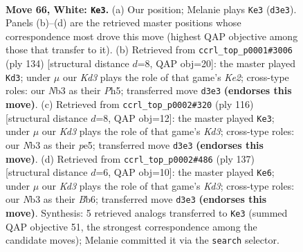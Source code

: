 \documentclass[11pt]{article}
\begin{document}
\clearpage

\begin{figure}[p]\centering
\begin{subfigure}{0.46\textwidth}\centering
\resizebox{\linewidth}{!}{%
\newchessgame
\chessboard[
  setfen={7k/2P5/2r5/8/8/1N1K2B1/8/8 w - - 45 66},
  showmover=false,
  pgfstyle=straightmove, color=movearrow, markmove={d3-e3}
]}
\caption{}
\end{subfigure}\hfill
\begin{subfigure}{0.46\textwidth}\centering
\resizebox{\linewidth}{!}{%
\newchessgame
\chessboard[
  setfen={8/1B6/2P5/2r4P/8/6k1/4K3/8 w - - 3 68},
  showmover=false,
  pgfstyle=straightmove, color=movearrow, markmove={e2-d3}
]}
\caption{}
\end{subfigure}
\\[4pt]
\begin{subfigure}{0.46\textwidth}\centering
\resizebox{\linewidth}{!}{%
\newchessgame
\chessboard[
  setfen={8/1B6/P7/2k1p3/r7/3K4/8/8 w - - 11 59},
  showmover=false,
  pgfstyle=straightmove, color=movearrow, markmove={d3-e3}
]}
\caption{}
\end{subfigure}\hfill
\begin{subfigure}{0.46\textwidth}\centering
\resizebox{\linewidth}{!}{%
\newchessgame
\chessboard[
  setfen={b7/5R2/1b1k4/8/6K1/5p2/8/8 b - - 3 69},
  showmover=false,
  pgfstyle=straightmove, color=movearrow, markmove={d6-e6}
]}
\caption{}
\end{subfigure}
\caption{\textbf{Move 66, White: \texttt{Ke3}.} (a) Our position; Melanie plays \texttt{Ke3} (\texttt{d3e3}). Panels (b)--(d) are the retrieved master positions whose correspondence most drove this move (highest QAP objective among those that transfer to it). (b) Retrieved from \texttt{ccrl\_top\_p0001\#3006} (ply 134) [structural distance $d$=8, QAP obj=20]: the master played \texttt{Kd3}; under $\mu$ our \emph{Kd3} plays the role of that game's \emph{Ke2}; cross-type roles: our \emph{N}b3 as their \emph{P}h5; transferred move \texttt{d3e3} \textbf{(endorses this move)}. (c) Retrieved from \texttt{ccrl\_top\_p0002\#320} (ply 116) [structural distance $d$=8, QAP obj=12]: the master played \texttt{Ke3}; under $\mu$ our \emph{Kd3} plays the role of that game's \emph{Kd3}; cross-type roles: our \emph{N}b3 as their \emph{p}e5; transferred move \texttt{d3e3} \textbf{(endorses this move)}. (d) Retrieved from \texttt{ccrl\_top\_p0002\#486} (ply 137) [structural distance $d$=6, QAP obj=10]: the master played \texttt{Ke6}; under $\mu$ our \emph{Kd3} plays the role of that game's \emph{Kd3}; cross-type roles: our \emph{N}b3 as their \emph{B}b6; transferred move \texttt{d3e3} \textbf{(endorses this move)}. Synthesis: 5 retrieved analogs transferred to \texttt{Ke3} (summed QAP objective 51, the strongest correspondence among the candidate moves); Melanie committed it via the \texttt{search} selector.}
\label{fig:thought-m130}
\end{figure}
\end{document}
